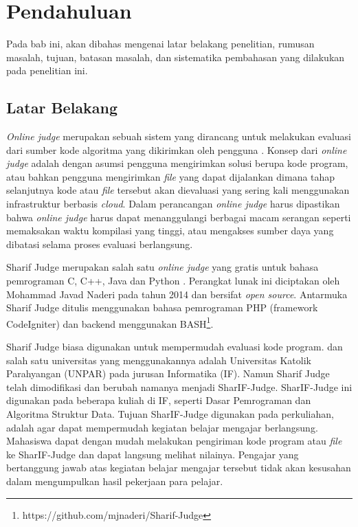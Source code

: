 \newcommand{\oj}{\textit{online judge }}

\chapter{Pendahuluan}
\label{chap:intro}
Pada bab ini, akan dibahas mengenai latar belakang penelitian, rumusan masalah, tujuan, batasan masalah, dan sistematika pembahasan yang dilakukan pada penelitian ini.
   
\section{Latar Belakang}
\label{sec:label}

\textit{Online judge} merupakan sebuah sistem yang dirancang untuk melakukan evaluasi dari sumber kode algoritma yang dikirimkan oleh pengguna \cite{online_judge2001}. Konsep dari \oj adalah dengan asumsi pengguna mengirimkan solusi berupa kode program, atau bahkan pengguna mengirimkan \textit{file} yang dapat dijalankan dimana tahap selanjutnya kode atau \textit{file}  tersebut akan dievaluasi yang sering kali menggunakan infrastruktur berbasis \textit{cloud}. Dalam perancangan \oj harus dipastikan bahwa \oj harus dapat menanggulangi berbagai macam serangan seperti memaksakan waktu kompilasi yang tinggi, atau mengakses sumber daya yang dibatasi selama proses evaluasi berlangsung.

Sharif Judge merupakan salah satu \oj yang gratis untuk bahasa pemrograman C, C++, Java dan Python . Perangkat lunak ini diciptakan oleh Mohammad Javad Naderi pada tahun 2014 dan bersifat \textit{open source}. Antarmuka Sharif Judge ditulis menggunakan bahasa pemrograman PHP (framework CodeIgniter) dan backend menggunakan BASH\footnote{https://github.com/mjnaderi/Sharif-Judge}.

Sharif Judge biasa digunakan untuk mempermudah evaluasi kode program. dan salah satu universitas yang menggunakannya adalah Universitas Katolik Parahyangan (UNPAR) pada jurusan Informatika (IF). Namun Sharif Judge telah dimodifikasi dan berubah namanya menjadi SharIF-Judge. SharIF-Judge ini digunakan pada beberapa kuliah di IF, seperti Dasar Pemrograman dan Algoritma Struktur Data. Tujuan SharIF-Judge digunakan pada perkuliahan, adalah agar dapat mempermudah kegiatan belajar mengajar berlangsung. Mahasiswa dapat dengan mudah melakukan pengiriman kode program atau \textit{file} ke SharIF-Judge dan dapat langsung melihat nilainya. Pengajar yang bertanggung jawab atas kegiatan belajar mengajar tersebut tidak akan kesusahan dalam mengumpulkan hasil pekerjaan para pelajar. 

